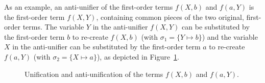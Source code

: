 As an example, an anti-unifier of the first-order terms $f(X,b)$ and $f(a,Y)$ is the first-order term $f(X,Y)$, containing common pieces of the two original, first-order terms. The variable $Y$ in the anti-unifier $f(X,Y)$ can be substituted by the first-order term $b$ to re-create $f(X,b)$ (with $\sigma_1 = \{Y\mapsto b\}$) and the variable $X$ in the anti-unifier can be substituted by the first-order term $a$ to re-create $f(a,Y)$
(with $\sigma_2 = \{X\mapsto a\}$), as depicted in Figure~\ref{fig:uni-anti-uni}.

\begin{figure} [t]
\centering{}
  \caption{Unification and anti-unification of the terms $f(X,b)$ and $f(a,Y)$.}
  \label{fig:uni-anti-uni}
\end{figure}

